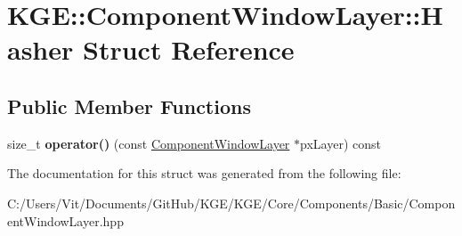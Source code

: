 \hypertarget{struct_k_g_e_1_1_component_window_layer_1_1_hasher}{\section{K\-G\-E\-:\-:Component\-Window\-Layer\-:\-:Hasher Struct Reference}
\label{struct_k_g_e_1_1_component_window_layer_1_1_hasher}
}
\subsection*{Public Member Functions}
\begin{DoxyCompactItemize}
\item 
\hypertarget{struct_k_g_e_1_1_component_window_layer_1_1_hasher_a4a9b61ec9fef44279fe3cf5f20936e7c}{size\-\_\-t {\bfseries operator()} (const \hyperlink{class_k_g_e_1_1_component_window_layer}{Component\-Window\-Layer} $\ast$px\-Layer) const }\label{struct_k_g_e_1_1_component_window_layer_1_1_hasher_a4a9b61ec9fef44279fe3cf5f20936e7c}

\end{DoxyCompactItemize}


The documentation for this struct was generated from the following file\-:\begin{DoxyCompactItemize}
\item 
C\-:/\-Users/\-Vit/\-Documents/\-Git\-Hub/\-K\-G\-E/\-K\-G\-E/\-Core/\-Components/\-Basic/Component\-Window\-Layer.\-hpp\end{DoxyCompactItemize}
